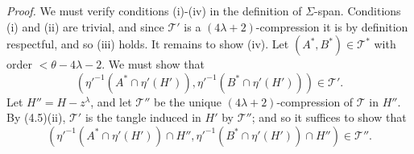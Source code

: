 \textit{Proof.} We must verify conditions (i)-(iv) in the definition of $\Sigma$-span. Conditions (i) and (ii) are trivial, and since $\mathcal{T}'$ is a $(4\lambda + 2)$-compression it is by definition respectful, and so (iii) holds. It remains to show (iv). Let $(A^*, B^*) \in \mathcal{T}^*$ with order $< \theta - 4\lambda - 2$. We must show that
\begin{equation*}
(\eta'^{-1}(A^* \cap \eta'(H')), \eta'^{-1}(B^* \cap \eta'(H'))) \in \mathcal{T}'.
\end{equation*}
Let $H'' = H - z^\lambda$, and let $\mathcal{T}''$ be the unique $(4\lambda + 2)$-compression of $\mathcal{T}$ in $H''$. By (4.5)(ii), $\mathcal{T}'$ is the tangle induced in $H'$ by $\mathcal{T}''$; and so it suffices to show that
\begin{equation*}
(\eta'^{-1}(A^* \cap \eta'(H')) \cap H'', \eta'^{-1}(B^* \cap \eta'(H')) \cap H'') \in \mathcal{T}''.
\end{equation*}
